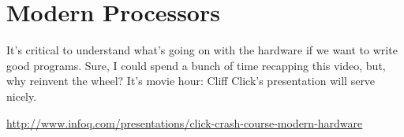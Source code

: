 




\section*{Modern Processors}

It's critical to understand what's going on with the hardware if we want to write good programs. Sure, I could spend a bunch of time recapping this video, but, why reinvent the wheel? It's movie hour: Cliff Click's presentation will serve nicely.



\begin{center}
\url{http://www.infoq.com/presentations/click-crash-course-modern-hardware}
\end{center}



